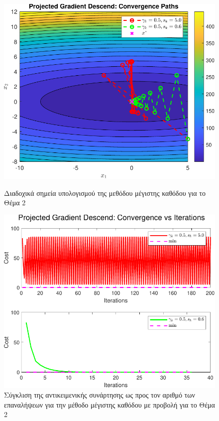 \documentclass[a4paper,12pt]{article}
\begin{document}
\begin{figure}[h]
    \centering
    \begin{minipage}{0.47\textwidth}
        \centering
        \includegraphics[width=1\linewidth]{plot/task2_contour.pdf}
        \caption{\small Διαδοχικά σημεία υπολογισμού της μεθόδου μέγιστης καθόδου για το Θέμα 2}
        \label{fig:task2_contour}
    \end{minipage} \hfill
    \begin{minipage}{0.47\textwidth}
        \centering
        \includegraphics[width=1\linewidth]{plot/task2_convergence.pdf}
        \caption{\small Σύγκλιση της αντικειμενικής συνάρτησης ως προς τον αριθμό των επαναλήψεων για την μέθοδο μέγιστης καθόδου με προβολή για το Θέμα 2}
        \label{fig:task2_convergence}
    \end{minipage}
\end{figure}
\end{document}
